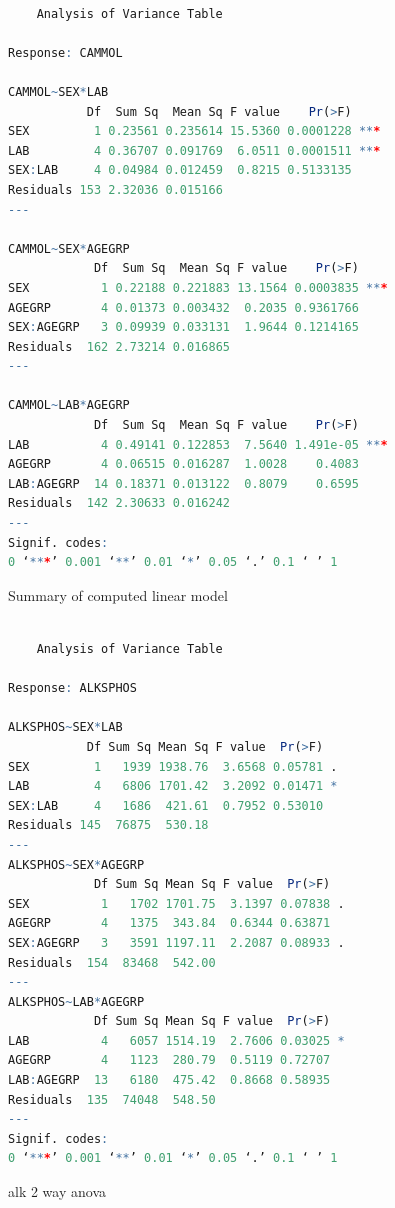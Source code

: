 \documentclass{article}
\begin{document}
  	\begin{figure}[H]
	\begin{lstlisting}[language=R]
  
    Analysis of Variance Table

Response: CAMMOL

CAMMOL~SEX*LAB
           Df  Sum Sq  Mean Sq F value    Pr(>F)    
SEX         1 0.23561 0.235614 15.5360 0.0001228 ***
LAB         4 0.36707 0.091769  6.0511 0.0001511 ***
SEX:LAB     4 0.04984 0.012459  0.8215 0.5133135    
Residuals 153 2.32036 0.015166                      
---

CAMMOL~SEX*AGEGRP
            Df  Sum Sq  Mean Sq F value    Pr(>F)    
SEX          1 0.22188 0.221883 13.1564 0.0003835 ***
AGEGRP       4 0.01373 0.003432  0.2035 0.9361766    
SEX:AGEGRP   3 0.09939 0.033131  1.9644 0.1214165    
Residuals  162 2.73214 0.016865                      
---

CAMMOL~LAB*AGEGRP
            Df  Sum Sq  Mean Sq F value    Pr(>F)    
LAB          4 0.49141 0.122853  7.5640 1.491e-05 ***
AGEGRP       4 0.06515 0.016287  1.0028    0.4083    
LAB:AGEGRP  14 0.18371 0.013122  0.8079    0.6595    
Residuals  142 2.30633 0.016242                      
---
Signif. codes:  
0 ‘***’ 0.001 ‘**’ 0.01 ‘*’ 0.05 ‘.’ 0.1 ‘ ’ 1
    \end{lstlisting}
    \caption{Summary of computed linear model}
    \label{fig:cam2way}
    \end{figure}

  	\begin{figure}[H]
	\begin{lstlisting}[language=R]
  
    Analysis of Variance Table

Response: ALKSPHOS

ALKSPHOS~SEX*LAB
           Df Sum Sq Mean Sq F value  Pr(>F)  
SEX         1   1939 1938.76  3.6568 0.05781 .
LAB         4   6806 1701.42  3.2092 0.01471 *
SEX:LAB     4   1686  421.61  0.7952 0.53010  
Residuals 145  76875  530.18                  
---
ALKSPHOS~SEX*AGEGRP
            Df Sum Sq Mean Sq F value  Pr(>F)  
SEX          1   1702 1701.75  3.1397 0.07838 .
AGEGRP       4   1375  343.84  0.6344 0.63871  
SEX:AGEGRP   3   3591 1197.11  2.2087 0.08933 .
Residuals  154  83468  542.00                  
---
ALKSPHOS~LAB*AGEGRP
            Df Sum Sq Mean Sq F value  Pr(>F)  
LAB          4   6057 1514.19  2.7606 0.03025 *
AGEGRP       4   1123  280.79  0.5119 0.72707  
LAB:AGEGRP  13   6180  475.42  0.8668 0.58935  
Residuals  135  74048  548.50                  
---
Signif. codes:  
0 ‘***’ 0.001 ‘**’ 0.01 ‘*’ 0.05 ‘.’ 0.1 ‘ ’ 1
    \end{lstlisting}
    \caption{alk 2 way anova}
    \label{fig:alk2way}
    \end{figure}
    
\end{document}
